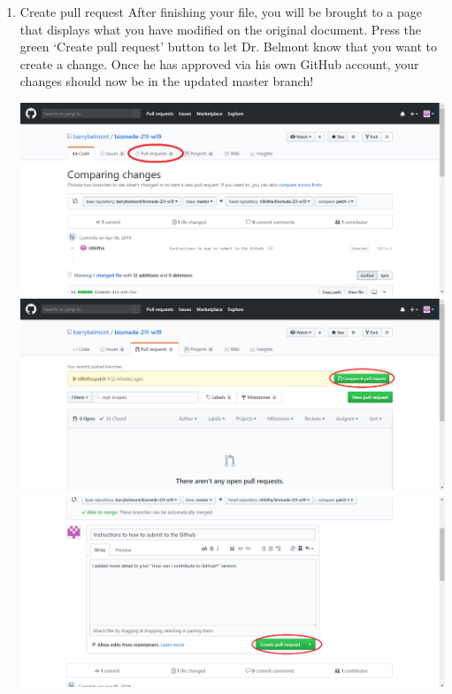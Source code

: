 \documentclass[11pt]{book}
\begin{document}
\begin{enumerate}
\subitem For those of you that are trying to figure out how to add your board pictures to the Github, the code to add images is as follows. To use the following code, you need to make sure the images are uploaded to the "figures" folder in the Github. Also, you will need to replace ``INSERT\_FILE\_NAME\_HERE'' with the name of the image file and ``FILE\_EXTENSION'' with the extension of the time (e.g. png or jpeg). You will need to copy and paste this code for each image you want to include. 

\begin{verbatim}
\texttt{[image: figures/INSERT\_FILE\_NAME\_HERE.FILE\_EXTENSION]}
\end{verbatim}

\item Create pull request
\subitem After finishing your file, you will be brought to a page that displays what you have modified on the original document. Press the green `Create pull request' button to let Dr. Belmont know that you want to create a change. Once he has approved via his own GitHub account, your changes should now be in the updated master branch!

\includegraphics[width=\textwidth]{figures/GitHub_Tutorial_3.png}
\includegraphics[width=\textwidth]{figures/GitHub_Tutorial_4.png}
\includegraphics[width=\textwidth]{figures/GitHub_Tutorial_5.png}


\end{enumerate}
\end{document}
